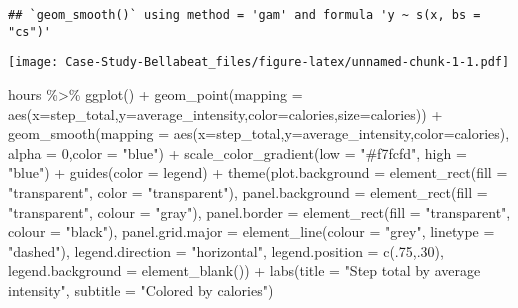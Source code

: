 \documentclass[
]{article}
\newenvironment{Shaded}{\begin{snugshade}}{\end{snugshade}}
\newcommand{\AttributeTok}[1]{\textcolor[rgb]{0.77,0.63,0.00}{#1}}
\newcommand{\DecValTok}[1]{\textcolor[rgb]{0.00,0.00,0.81}{#1}}
\newcommand{\FunctionTok}[1]{\textcolor[rgb]{0.00,0.00,0.00}{#1}}
\newcommand{\NormalTok}[1]{#1}
\newcommand{\SpecialCharTok}[1]{\textcolor[rgb]{0.00,0.00,0.00}{#1}}
\newcommand{\StringTok}[1]{\textcolor[rgb]{0.31,0.60,0.02}{#1}}
\begin{document}
\begin{verbatim}
## `geom_smooth()` using method = 'gam' and formula 'y ~ s(x, bs = "cs")'
\end{verbatim}

\texttt{[image: Case-Study-Bellabeat\_files/figure-latex/unnamed-chunk-1-1.pdf]}

\begin{Shaded}
\begin{Highlighting}[]
\NormalTok{hours }\SpecialCharTok{\%\textgreater{}\%}
  \FunctionTok{ggplot}\NormalTok{() }\SpecialCharTok{+} 
  \FunctionTok{geom\_point}\NormalTok{(}\AttributeTok{mapping =} \FunctionTok{aes}\NormalTok{(}\AttributeTok{x=}\NormalTok{step\_total,}\AttributeTok{y=}\NormalTok{average\_intensity,}\AttributeTok{color=}\NormalTok{calories,}\AttributeTok{size=}\NormalTok{calories)) }\SpecialCharTok{+} 
  \FunctionTok{geom\_smooth}\NormalTok{(}\AttributeTok{mapping =} \FunctionTok{aes}\NormalTok{(}\AttributeTok{x=}\NormalTok{step\_total,}\AttributeTok{y=}\NormalTok{average\_intensity,}\AttributeTok{color=}\NormalTok{calories), }\AttributeTok{alpha =} \DecValTok{0}\NormalTok{,}\AttributeTok{color =} \StringTok{"blue"}\NormalTok{) }\SpecialCharTok{+} 
  \FunctionTok{scale\_color\_gradient}\NormalTok{(}\AttributeTok{low =} \StringTok{"\#f7fcfd"}\NormalTok{, }\AttributeTok{high =} \StringTok{"blue"}\NormalTok{) }\SpecialCharTok{+}
  \FunctionTok{guides}\NormalTok{(}\AttributeTok{color =} \StringTok{\textquotesingle{}legend\textquotesingle{}}\NormalTok{) }\SpecialCharTok{+}
  \FunctionTok{theme}\NormalTok{(}\AttributeTok{plot.background =} \FunctionTok{element\_rect}\NormalTok{(}\AttributeTok{fill =} \StringTok{"transparent"}\NormalTok{, }\AttributeTok{color =} \StringTok{"transparent"}\NormalTok{),}
        \AttributeTok{panel.background =} \FunctionTok{element\_rect}\NormalTok{(}\AttributeTok{fill =} \StringTok{"transparent"}\NormalTok{, }\AttributeTok{colour =} \StringTok{"gray"}\NormalTok{),}
        \AttributeTok{panel.border =} \FunctionTok{element\_rect}\NormalTok{(}\AttributeTok{fill =} \StringTok{"transparent"}\NormalTok{, }\AttributeTok{colour =} \StringTok{"black"}\NormalTok{),}
        \AttributeTok{panel.grid.major =} \FunctionTok{element\_line}\NormalTok{(}\AttributeTok{colour =} \StringTok{"grey"}\NormalTok{, }\AttributeTok{linetype =} \StringTok{"dashed"}\NormalTok{),}
        \AttributeTok{legend.direction =} \StringTok{"horizontal"}\NormalTok{,}
        \AttributeTok{legend.position =} \FunctionTok{c}\NormalTok{(.}\DecValTok{75}\NormalTok{,.}\DecValTok{30}\NormalTok{), }
        \AttributeTok{legend.background =} \FunctionTok{element\_blank}\NormalTok{()) }\SpecialCharTok{+}
  \FunctionTok{labs}\NormalTok{(}\AttributeTok{title =} \StringTok{"Step total by average intensity"}\NormalTok{, }\AttributeTok{subtitle =} \StringTok{"Colored by calories"}\NormalTok{)}
\end{Highlighting}
\end{Shaded}
\end{document}
